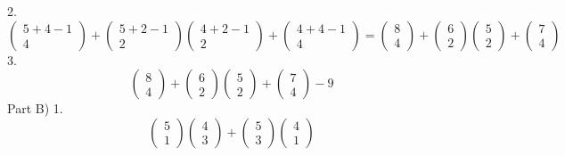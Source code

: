 \documentclass{article}
\begin{document}
	2.
	$$
	\left(\begin{array}{c}
	5+4-1\\
	4
	\end{array}\right)
	+
	\left(\begin{array}{c}
	5+2-1\\
	2
	\end{array}\right)
	\left(\begin{array}{c}
	4+2-1\\
	2
	\end{array}\right)
	+
	\left(\begin{array}{c}
	4+4-1\\
	4
	\end{array}\right)
	=
	\left(\begin{array}{c}
	8\\
	4
	\end{array}\right)
	+
	\left(\begin{array}{c}
	6\\
	2
	\end{array}\right)
	\left(\begin{array}{c}
	5\\
	2
	\end{array}\right)
	+
	\left(\begin{array}{c}
	7\\
	4
	\end{array}\right)
	$$
	3.
	$$
	\left(\begin{array}{c}
	8\\
	4
	\end{array}\right)
	+
	\left(\begin{array}{c}
	6\\
	2
	\end{array}\right)
	\left(\begin{array}{c}
	5\\
	2
	\end{array}\right)
	+
	\left(\begin{array}{c}
	7\\
	4
	\end{array}\right)
	-
	9
	$$
	Part B) 1.
	$$
	\left(\begin{array}{c}
	5\\
	1
	\end{array}\right)
	\left(\begin{array}{c}
	4\\
	3
	\end{array}\right)
	+
	\left(\begin{array}{c}
	5\\
	3
	\end{array}\right)
	\left(\begin{array}{c}
	4\\
	1
	\end{array}\right)
	$$
\end{document}

